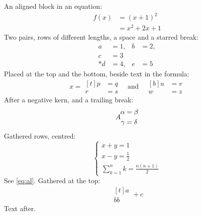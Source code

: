 \documentclass{article}
\begin{document}
An aligned block in an equation:
\begin{equation}
\begin{aligned}
f(x) &= (x+1)^2 \\
     &= x^2 + 2x + 1
\end{aligned}
\label{eq:al}
\end{equation}
Two pairs, rows of different lengths, a space and a starred break:
\[
\begin{aligned}
a &= 1, & b &= 2, \\[2pt]
c &= 3 \\*
d &= 4, & e &= 5
\end{aligned}
\]
Placed at the top and the bottom, beside text in the formula:
\[
x = \begin{aligned}[t] p &= q \\ r &= s \end{aligned}
\quad\text{and}\quad
\begin{aligned}[b] u &= v \\ w &= z \end{aligned}
\]
After a negative kern, and a trailing break:
\[
A \kern-2pt \begin{aligned} \alpha &= \beta \\ \gamma &= \delta \\ \end{aligned}
\]
Gathered rows, centred:
\begin{equation}
\left\{
\begin{gathered}
x + y = 1 \\
x - y = \frac{1}{2} \\[3pt]
\sum_{k=1}^{n} k = \frac{n(n+1)}{2}
\end{gathered}
\right.
\end{equation}
See \eqref{eq:al}. Gathered at the top:
\[
\begin{gathered}[t] a \\ bb \end{gathered} + c
\]
Text after.
\end{document}
